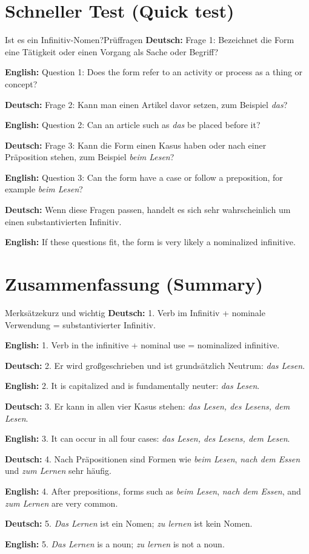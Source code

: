 \documentclass[a4paper,11pt]{article}
\newcommand{\GermanText}[1]{\textbf{Deutsch: }#1\par}
\newcommand{\EnglishText}[1]{{\small\color{SoftGray}\textbf{English: }#1\par}}
\begin{document}
\section{Schneller Test \textnormal{(Quick test)}}
\begin{grammarentry}{Ist es ein Infinitiv-Nomen?}{Prüffragen}
\GermanText{Frage 1: Bezeichnet die Form eine Tätigkeit oder einen Vorgang als Sache oder Begriff?}
\EnglishText{Question 1: Does the form refer to an activity or process as a thing or concept?}

\GermanText{Frage 2: Kann man einen Artikel davor setzen, zum Beispiel \textit{das}?}
\EnglishText{Question 2: Can an article such as \textit{das} be placed before it?}

\GermanText{Frage 3: Kann die Form einen Kasus haben oder nach einer Präposition stehen, zum Beispiel \textit{beim Lesen}?}
\EnglishText{Question 3: Can the form have a case or follow a preposition, for example \textit{beim Lesen}?}

\GermanText{Wenn diese Fragen passen, handelt es sich sehr wahrscheinlich um einen substantivierten Infinitiv.}
\EnglishText{If these questions fit, the form is very likely a nominalized infinitive.}
\end{grammarentry}

\section{Zusammenfassung \textnormal{(Summary)}}
\begin{grammarentry}{Merksätze}{kurz und wichtig}
\GermanText{1. Verb im Infinitiv + nominale Verwendung = substantivierter Infinitiv.}
\EnglishText{1. Verb in the infinitive + nominal use = nominalized infinitive.}

\GermanText{2. Er wird großgeschrieben und ist grundsätzlich Neutrum: \textit{das Lesen}.}
\EnglishText{2. It is capitalized and is fundamentally neuter: \textit{das Lesen}.}

\GermanText{3. Er kann in allen vier Kasus stehen: \textit{das Lesen, des Lesens, dem Lesen}.}
\EnglishText{3. It can occur in all four cases: \textit{das Lesen, des Lesens, dem Lesen}.}

\GermanText{4. Nach Präpositionen sind Formen wie \textit{beim Lesen}, \textit{nach dem Essen} und \textit{zum Lernen} sehr häufig.}
\EnglishText{4. After prepositions, forms such as \textit{beim Lesen}, \textit{nach dem Essen}, and \textit{zum Lernen} are very common.}

\GermanText{5. \textit{Das Lernen} ist ein Nomen; \textit{zu lernen} ist kein Nomen.}
\EnglishText{5. \textit{Das Lernen} is a noun; \textit{zu lernen} is not a noun.}
\end{grammarentry}
\end{document}
